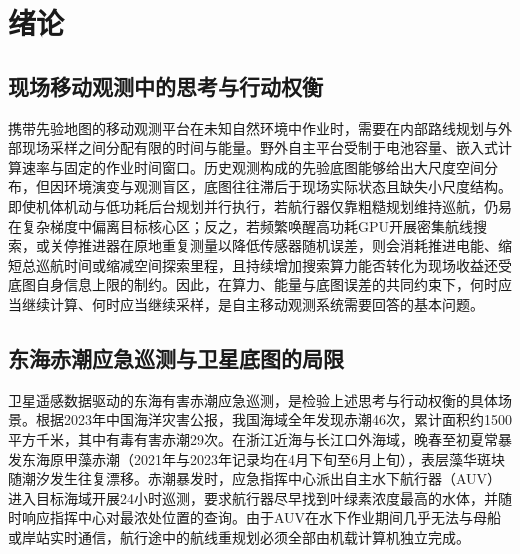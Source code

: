 \section{绪论}

\subsection{现场移动观测中的思考与行动权衡}

携带先验地图的移动观测平台在未知自然环境中作业时，需要在内部路线规划与外部现场采样之间分配有限的时间与能量\cite{horvitz1987reasoning, russell1991right, shen2025thinking}。野外自主平台受制于电池容量、嵌入式计算速率与固定的作业时间窗口\cite{xiao2020thinking, magnino2026metareasoning}。历史观测构成的先验底图能够给出大尺度空间分布，但因环境演变与观测盲区，底图往往滞后于现场实际状态且缺失小尺度结构\cite{fossum2019, beckers2003dineof}。即使机体机动与低功耗后台规划并行执行，若航行器仅靠粗糙规划维持巡航，仍易在复杂梯度中偏离目标核心区；反之，若频繁唤醒高功耗GPU开展密集航线搜索，或关停推进器在原地重复测量以降低传感器随机误差，则会消耗推进电能、缩短总巡航时间或缩减空间探索里程\cite{cuadron2025overthinking, elboher2023formal}，且持续增加搜索算力能否转化为现场收益还受底图自身信息上限的制约\cite{jiang2015horizon, smith2006curse}。因此，在算力、能量与底图误差的共同约束下，何时应当继续计算、何时应当继续采样，是自主移动观测系统需要回答的基本问题\cite{hunt2021formalizing}。

\subsection{东海赤潮应急巡测与卫星底图的局限}

卫星遥感数据驱动的东海有害赤潮应急巡测，是检验上述思考与行动权衡的具体场景\cite{fossum2019, lou2014diurnal}。根据2023年中国海洋灾害公报，我国海域全年发现赤潮46次，累计面积约1500平方千米，其中有毒有害赤潮29次\cite{mnr2024bulletin}。在浙江近海与长江口外海域，晚春至初夏常暴发东海原甲藻赤潮（2021年与2023年记录均在4月下旬至6月上旬）\cite{zhao2025distinguishing}，表层藻华斑块随潮汐发生往复漂移\cite{lou2014diurnal}。赤潮暴发时，应急指挥中心派出自主水下航行器（AUV）进入目标海域开展24小时巡测，要求航行器尽早找到叶绿素浓度最高的水体，并随时响应指挥中心对最浓处位置的查询\cite{fossum2019, remus100}。由于AUV在水下作业期间几乎无法与母船或岸站实时通信，航行途中的航线重规划必须全部由机载计算机独立完成。

